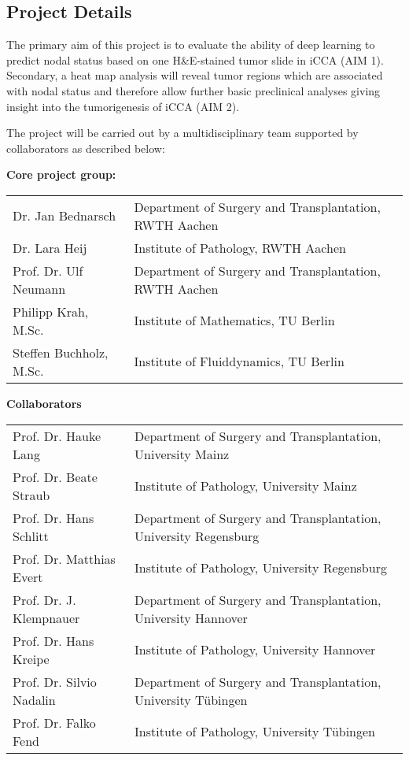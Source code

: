 \documentclass[12pt]{article}
\begin{document}
\newpage
\subsection{Project Details}
The primary aim of this project is to evaluate the ability of deep learning to predict nodal status based on one H\&E-stained tumor slide in iCCA (AIM 1). Secondary, a heat map analysis will reveal tumor regions which are associated with nodal status and therefore allow further basic preclinical analyses giving insight into the tumorigenesis of iCCA (AIM 2).

The project will be carried out by a multidisciplinary team supported by collaborators as described below:

\textbf{Core project group:}
\begin{table}[H]
	\footnotesize
  \begin{center}
    \begin{tabular}{p{4cm} p{11cm}}
			Dr. Jan Bednarsch	&	Department of Surgery and Transplantation, RWTH Aachen\\
			Dr. Lara Heij			&		Institute of Pathology, RWTH Aachen\\
			Prof. Dr. Ulf Neumann&	Department of Surgery and Transplantation, RWTH Aachen\\
			Philipp Krah, M.Sc.	&		Institute of Mathematics, TU Berlin\\
			Steffen Buchholz, M.Sc.	&	Institute of Fluiddynamics, TU Berlin\\
\end{tabular}
\end{center}
\end{table}


\textbf{Collaborators}
\begin{table}[H]
	\footnotesize
  \begin{center}
    \begin{tabular}{p{4cm} p{11cm}}
			Prof. Dr. Hauke Lang			&Department of Surgery and Transplantation, University Mainz\\
			Prof. Dr. Beate Straub 		&Institute of Pathology, University Mainz \\
			Prof. Dr. Hans Schlitt		&Department of Surgery and Transplantation, University Regensburg\\
			Prof. Dr. Matthias Evert	&Institute of Pathology, University Regensburg\\
			Prof. Dr. J. Klempnauer		&Department of Surgery and Transplantation, University Hannover\\
			Prof. Dr. Hans Kreipe			&Institute of Pathology, University Hannover\\
			Prof. Dr. Silvio Nadalin	&Department of Surgery and Transplantation, University Tübingen\\
			Prof. Dr. Falko Fend			&Institute of Pathology, University Tübingen
    \end{tabular}
  \end{center}
\end{table}
\end{document}
